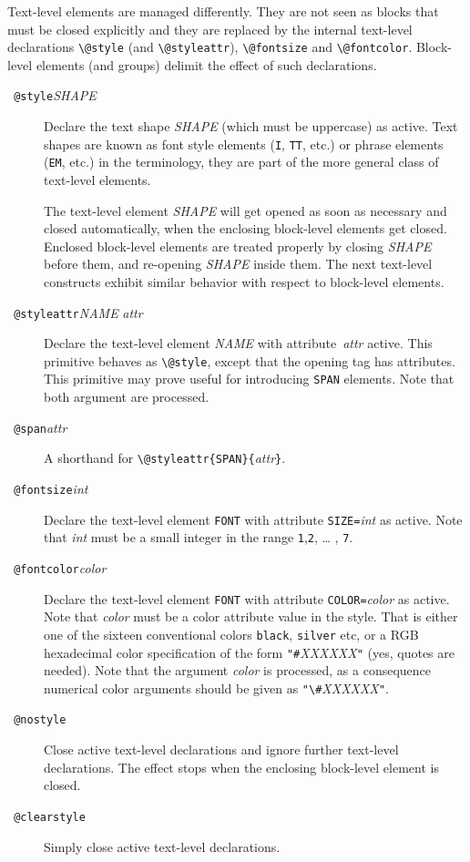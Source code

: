 Text-level elements are managed differently. They are not seen
as blocks that must be closed explicitly and they are replaced by the
internal text-level declarations \verb+\@style+ (and
\verb+\@styleattr+), \verb+\@fontsize+ and
\verb+\@fontcolor+. Block-level elements (and \html{} groups)
delimit the effect of such declarations.
\begin{description}
\item[{\tt{} @style}{\it SHAPE}{\tt{}}]
Declare the text shape \textit{SHAPE} (which must be uppercase)
as active. Text shapes are known as font style elements (\verb+I+, \verb+TT+,
etc.) or phrase elements (\verb+EM+, etc.) in the
\html{} terminology, they are part of the more general class of
text-level elements.

The text-level element {\it SHAPE} will get opened as soon as
necessary and closed automatically, when the
enclosing block-level elements get closed.
Enclosed block-level elements are treated properly by closing {\it
SHAPE} before them, and re-opening {\it SHAPE} inside them.
The next text-level constructs exhibit similar behavior with respect
to block-level elements.
\item[{\tt{} @styleattr}{\it NAME}{\tt{}}{\it
attr}{\tt{}}]
Declare the text-level element \textit{NAME} with
attribute~\textit{attr}
active. This primitive behaves as \verb+\@style+, except that the
opening tag has attributes.
This primitive may prove useful for introducing \texttt{SPAN} elements.
Note that both argument are processed.
\item[{{\tt{} @span}{\it attr}{\tt{}}}]
A shorthand for \verb+\@styleattr{SPAN}{+\textit{attr}\verb+}+.
\item[{\tt{} @fontsize}{\it int}{\tt{}}]
Declare the text-level element \verb+FONT+ with attribute
\verb+SIZE=+\textit{int} as active. Note that \textit{int} must
be a small integer in the range \texttt{1},\texttt{2}, \ldots{} , \texttt{7}.
\item[{\tt{} @fontcolor}{\it color}{\tt{}}]
Declare the text-level element \verb+FONT+ with attribute
\verb+COLOR=+\textit{color} as active.
Note that \textit{color} must be a color attribute value in the \html{}
style. That is either one of the sixteen conventional colors
\verb+black+, \verb+silver+ etc, or a RGB hexadecimal color specification
of the form
\verb+"#+\textit{XXXXXX}\verb+"+ (yes, quotes are needed).
Note that the argument \textit{color} is processed, as a consequence
numerical color arguments should be given as \verb+"\#+\textit{XXXXXX}\verb+"+.

\item[{\tt{} @nostyle}]
Close active text-level declarations and ignore further text-level
declarations.
The effect stops when the enclosing block-level element is closed.
\item[{\tt{} @clearstyle}]
Simply close active text-level declarations.
\end{description}

